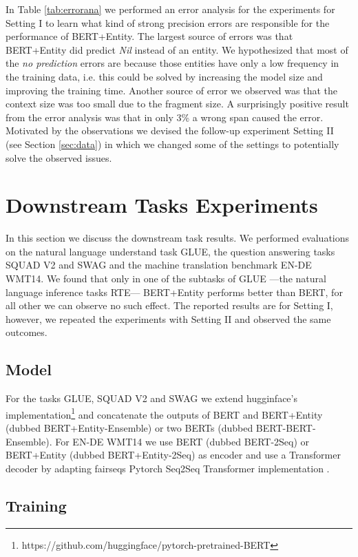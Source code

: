 \documentclass[11pt,a4paper]{article}
\begin{document}
In Table \ref{tab:errorana} we performed an error analysis for the experiments for Setting I to learn what kind of strong precision errors are responsible for the performance of BERT+Entity. The largest source of errors was that BERT+Entity did predict \textit{Nil} instead of an entity. We hypothesized that most of the \textit{no prediction} errors are because those entities have only a low frequency in the training data, i.e. this could be solved by increasing the model size and improving the training time. Another source of error we observed was that the context size was too small due to the fragment size. A surprisingly positive result from the error analysis was that in only 3\% a wrong span caused the error. Motivated by the observations we devised the follow-up experiment Setting II (see Section \ref{sec:data}) in which we changed some of the settings to potentially solve the observed issues.  


\section{Downstream Tasks Experiments}

In this section we discuss the downstream task results. We performed evaluations on the natural language understand task GLUE, the question answering tasks SQUAD V2 and SWAG and the machine translation benchmark EN-DE WMT14. We found that only in one of the subtasks of GLUE ---the natural language inference tasks RTE--- BERT+Entity performs better than BERT, for all other we can observe no such effect. The reported results are for Setting I, however, we repeated the experiments with Setting II and observed the same outcomes. 

\subsection{Model}

For the tasks GLUE, SQUAD V2 and SWAG we extend hugginface's implementation\footnote{https://github.com/huggingface/pytorch-pretrained-BERT} and concatenate the outputs of BERT and BERT+Entity (dubbed BERT+Entity-Ensemble) or two BERTs (dubbed BERT-BERT-Ensemble). For EN-DE WMT14 we use BERT (dubbed BERT-2Seq) or BERT+Entity (dubbed BERT+Entity-2Seq) as encoder and use a Transformer decoder by adapting fairseqs Pytorch Seq2Seq Transformer implementation \citep{ott2019fairseq}. 

\subsection{Training}
\end{document}
